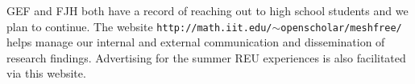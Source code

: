 \documentclass[11pt]{NSFamsart}
\begin{document}
\begin{description}[leftmargin=2.5ex]
\item[Reaching Out]
GEF and FJH both have a record of reaching out to high school students and we plan to continue. The website {\tt http://math.iit.edu/$\sim$openscholar/meshfree/} helps manage our internal and external communication and dissemination of research findings. Advertising for the summer REU experiences is also facilitated via this website.
\end{description}

\newpage
\clearpage
{}



\renewcommand{\refname}{\hfill \textbf{\large References Cited} \hfill \hfill}                   %
\renewcommand{\bibliofont}{\normalsize}


\end{document}
